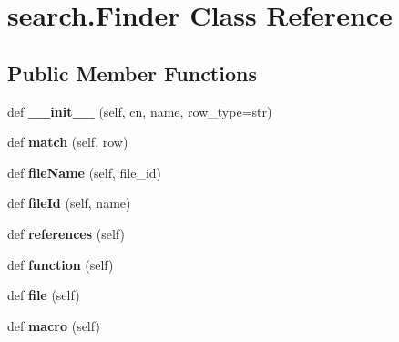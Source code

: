 \hypertarget{classsearch_1_1_finder}{}\section{search.\+Finder Class Reference}
\label{classsearch_1_1_finder}
\subsection*{Public Member Functions}
\begin{DoxyCompactItemize}
\item 
\mbox{\label{classsearch_1_1_finder_a54f54234162c6279079510026cfd3883}} 
def {\bfseries \+\_\+\+\_\+init\+\_\+\+\_\+} (self, cn, name, row\+\_\+type=str)
\item 
\mbox{\label{classsearch_1_1_finder_a74fd15ad555dd92e01905b9320b703fd}} 
def {\bfseries match} (self, row)
\item 
\mbox{\label{classsearch_1_1_finder_a1b96962b3a26241daf7a3b6ffc0feb3e}} 
def {\bfseries file\+Name} (self, file\+\_\+id)
\item 
\mbox{\label{classsearch_1_1_finder_a16764f7db3ba8dbff218800bcd3e7457}} 
def {\bfseries file\+Id} (self, name)
\item 
\mbox{\label{classsearch_1_1_finder_a1ba7217e487291653b53c0d164a5fe30}} 
def {\bfseries references} (self)
\item 
\mbox{\label{classsearch_1_1_finder_ab68fc36a6e6a691759dda9f014f18065}} 
def {\bfseries function} (self)
\item 
\mbox{\label{classsearch_1_1_finder_a0dba4813703f4b5d9a0b0d7e91551922}} 
def {\bfseries file} (self)
\item 
\mbox{\label{classsearch_1_1_finder_a670a8def838c4293c9bf7acac0b51957}} 
def {\bfseries macro} (self)
\item 
\mbox{\label{classsearch_1_1_finder_afc6c5605780194c21442e7bfa8863d74}} 

\end{DoxyCompactItemize}
